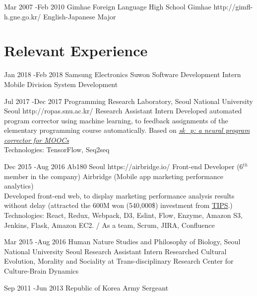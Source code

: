 \documentclass[10pt]{article} %
\begin{document}


\job
{Mar 2007 -}{Feb 2010}
{Gimhae Foreign Language High School}
{Gimhae}
{http://gimfl-h.gne.go.kr/}
{English-Japanese Major}
{}
\fi

\section{Relevant Experience}

\job
{Jan 2018 -}{Feb 2018}
{Samsung Electronics}
{Suwon}
{}
{Software Development Intern}
{Mobile Division System Development}

\job
{Jul 2017 -}{Dec 2017}
{Programming Research Laboratory, Seoul National University}
{Seoul}
{http://ropas.snu.ac.kr/}
{Research Assistant Intern}
{Developed automated program corrector using machine learning, to feedback assignments of the elementary programming course automatically. Based on \textit{\href{https://dl.acm.org/citation.cfm?id=2989222}{
sk\_p: a neural program corrector for MOOCs}}\\
Technologies: TensorFlow, Seq2seq}

\job
{Dec 2015 -}{Aug 2016}
{Ab180}
{Seoul}
{https://airbridge.io/}
{Front-end Developer (6$^{th}$ member in the company)}
{Airbridge (Mobile app marketing performance analytics)\\
Developed front-end web, to display marketing performance analysis results without delay (attracted the 600M won (540,000\$) investment from \href{http://www.jointips.or.kr/}{TIPS}.)\\
Technologies: React, Redux, Webpack, D3, Eslint, Flow, Enzyme, Amazon S3, Jenkins, Flask, Amazon EC2. / As a team, Scrum, JIRA, Confluence}

\if{}
\job
{Mar 2015 -}{Aug 2016}
{Human Nature Studies and Philosophy of Biology, Seoul National University}
{Seoul}
{}
{Research Assistant Intern}
{Researched Cultural Evolution, Morality and Sociality at Trans-disciplinary Research Center for Culture-Brain Dynamics}

\job
{Sep 2011 -}{Jun 2013}
{Republic of Korea Army}
{}
{}
{Sergeant}
\fi
\end{document}
